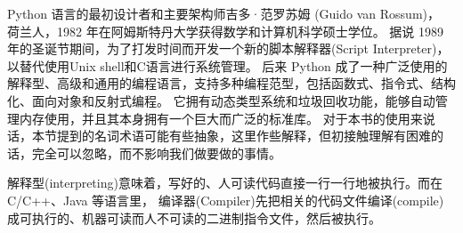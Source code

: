 \documentclass[main.tex]{subfiles}
\begin{document}
Python 语言的最初设计者和主要架构师吉多·范罗苏姆 (Guido van Rossum)， 荷兰人，1982 年在阿姆斯特丹大学获得数学和计算机科学硕士学位。
据说 1989 年的圣诞节期间，为了打发时间而开发一个新的脚本解释器(Script Interpreter)，以替代使用Unix shell和C语言进行系统管理。
后来 Python 成了一种广泛使用的解释型、高级和通用的编程语言，支持多种编程范型，包括函数式、指令式、结构化、面向对象和反射式编程。
它拥有动态类型系统和垃圾回收功能，能够自动管理内存使用，并且其本身拥有一个巨大而广泛的标准库。
对于本书的使用来说话，本节提到的名词术语可能有些抽象，这里作些解释，但初接触理解有困难的话，完全可以忽略，而不影响我们做要做的事情。

解释型(interpreting)意味着，写好的、人可读代码直接一行一行地被执行。而在 C/C++、Java 等语言里， 编译器(Compiler)先把相关的代码文件编译(compile)
成可执行的、机器可读而人不可读的二进制指令文件，然后被执行。
\end{document}
